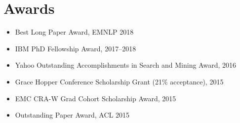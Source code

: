 \documentclass{resume}
\begin{document}
\section{Awards}
\begin{itemize}
\item {Best Long Paper Award, EMNLP 2018}
\item {IBM PhD Fellowship Award, 2017--2018}
\item {Yahoo Outstanding Accomplishments in Search and Mining Award, 2016}
\item {Grace Hopper Conference Scholarship Grant (21\% acceptance), 2015}
\item {EMC CRA-W Grad Cohort Scholarship Award, 2015}
\item {Outstanding Paper Award, ACL 2015}
\end{itemize}
\clearpage

\nocite{*}




\end{document}
